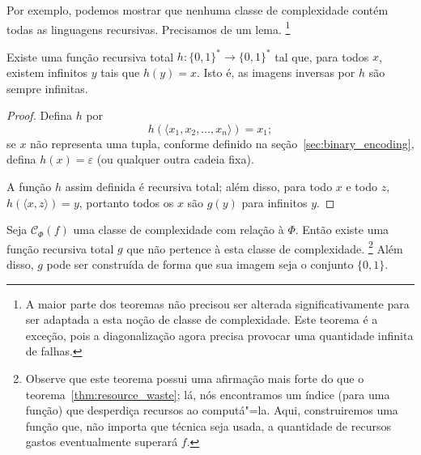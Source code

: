 Por exemplo,
podemos mostrar que
nenhuma classe de complexidade contém todas as linguagens recursivas.
Precisamos de um lema.%
\footnote{
    A maior parte dos teoremas não precisou ser alterada significativamente
    para ser adaptada a esta noção de classe de complexidade.
    Este teorema é a exceção,
    pois a diagonalização agora precisa provocar uma quantidade infinita de falhas.
}

\begin{lemma}
    Existe uma função recursiva total $h: \{0, 1\}^* \to \{0, 1\}^*$
    tal que, para todos $x$,
    existem infinitos $y$ tais que $h(y) = x$.
    Isto é, as imagens inversas por $h$ são sempre infinitas.
\end{lemma}

\begin{proof}
    Defina $h$ por
    \begin{equation*}
        h( \langle x_1, x_2, \dots, x_n \rangle ) = x_1;
    \end{equation*}
    se $x$ não representa uma tupla,
    conforme definido na seção~\ref{sec:binary_encoding},
    defina $h(x) = \varepsilon$
    (ou qualquer outra cadeia fixa).

    A função $h$ assim definida é recursiva total;
    além disso, para todo $x$ e todo $z$,
    $h(\langle x, z \rangle) = y$,
    portanto todos os $x$ são $g(y)$ para infinitos $y$.
\end{proof}

\begin{theorem}
    Seja $\mathcal C_\Phi(f)$ uma classe de complexidade
    com relação à $\Phi$.
    Então existe uma função recursiva total $g$
    que não pertence à esta classe de complexidade.%
    \footnote{
        Observe que este teorema possui uma afirmação mais forte
        do que o teorema~\ref{thm:resource_waste};
        lá,
        nós encontramos um índice (para uma função)
        que desperdiça recursos ao computá"=la.
        Aqui,
        construiremos uma função que,
        não importa que técnica seja usada,
        a quantidade de recursos gastos eventualmente superará $f$.
    }
    Além disso, $g$ pode ser construída de forma que
    sua imagem seja o conjunto $\{0, 1\}$.
    \label{thm:outside_class}
\end{theorem}

